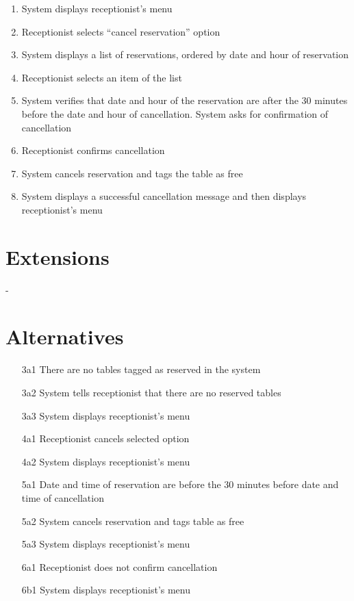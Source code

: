 \documentclass[a4paper,11pt,oneside]{book}
\newcommand{\tinytodo}[2][]{\todo[caption={#2}, size=\footnotesize, #1]{\renewcommand{\baselinestretch}{0.5}\selectfont#2\par}}
\newcommand{\cancel}[1]{#1 cancels selected option}
\newcommand{\menu}[1]{System displays #1's menu}
\begin{document}
\begin{enumerate}
\item \menu{receptionist}\tinytodo{pre?}
\item Receptionist selects ``cancel reservation'' option
\item System displays a list of reservations, ordered by date and hour of reservation
\item Receptionist selects an item of the list
\item System verifies that date and hour of the reservation are after the 30 minutes before the date and hour of cancellation. System asks for confirmation of cancellation
\item Receptionist confirms cancellation
\item System cancels reservation and tags the table as free
\item System displays a successful cancellation message and \tinytodo{split?} then displays receptionist's menu
\end{enumerate}

\section{Extensions}

-

\section{Alternatives}

\begin{enumerate}
  \item [3a1] There are no tables tagged as reserved in the system
  \item [3a2] System tells receptionist that there are no reserved tables
  \item [3a3] \menu{receptionist}
    \\
  \item [4a1] \cancel{Receptionist}
  \item [4a2] \menu{receptionist}
    \\
  \item [5a1] Date and time of reservation are before the 30 minutes before date and time of cancellation
  \item [5a2] System cancels reservation and tags table as free
  \item [5a3] \menu{receptionist}
    \\
  \item [6a1] Receptionist does not confirm cancellation
  \item [6b1] \menu{receptionist}
\end{enumerate}
\end{document}
